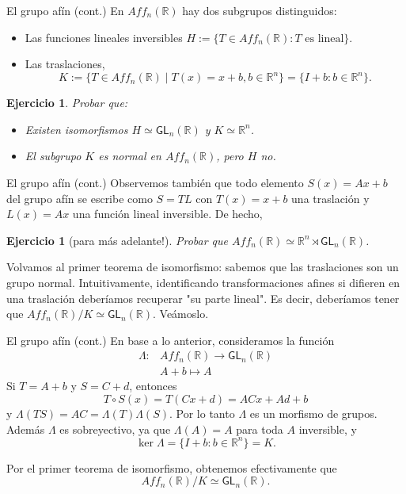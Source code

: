 \documentclass{beamer}
\def\R{\mathbb{R}}
\newtheorem{ejercicio}[teorema]{Ejercicio}
\begin{document}
\begin{frame}{El grupo afín (cont.)}
En $Aff_n(\R)$ hay dos subgrupos distinguidos:
\begin{itemize}
 \item Las funciones lineales inversibles $H := \{T \in Aff_n(\R) : \text{$T$ es lineal}\}$.
 \item Las traslaciones, 
\[
K := \{T \in Aff_n(\R) \mid T(x) = x+b, b \in \R^n\} = \{I + b : b \in \R^n\}.
\]
\end{itemize}

 \begin{ejercicio} Probar que:
\begin{itemize}
 \item Existen isomorfismos $H \simeq \mathsf{GL}_n(\R)$ y $K \simeq \R^n$.
 \item El subgrupo $K$ es normal en $Aff_n(\R)$, pero $H$ no. 
\end{itemize}
\end{ejercicio}
\end{frame}

\begin{frame}{El grupo afín (cont.)}
Observemos también que todo elemento $S(x) = Ax + b$ del grupo afín se escribe como $S = TL$ con $T(x) = x+b$ una traslación y $L(x) = Ax$ una función lineal inversible. De hecho,

\begin{ejercicio}[para más adelante!] Probar que $Aff_n(\R) \simeq \R^n \rtimes \mathsf{GL}_n(\R)$.
\end{ejercicio}
\medskip

Volvamos al primer teorema de isomorfismo: sabemos que las traslaciones son un grupo normal. Intuitivamente, identificando transformaciones afines si difieren en una traslación deberíamos recuperar "su parte lineal". Es decir, deberíamos tener que $Aff_n(\R)/K \simeq \mathsf{GL}_n(\R)$. Veámoslo.
\end{frame}

\begin{frame}{El grupo afín (cont.)}
En base a lo anterior, consideramos la función
\begin{align*}
\Lambda \colon &Aff_n(\R) \rightarrow \mathsf{GL}_n(\R) \\
&A+b \longmapsto A 
\end{align*}
 Si $T = A + b$ y $S = C + d$, entonces
\[
T \circ S(x) = T(Cx+d) = ACx + Ad + b
\]
y $\Lambda(TS) = AC = \Lambda(T)\Lambda(S)$. Por lo tanto $\Lambda$ es un morfismo de grupos. Además $\Lambda$ es sobreyectivo, ya que $\Lambda(A) = A$ para toda $A$ inversible, y
\[
\ker \Lambda = \{I+b : b \in \R^n\} = K.
\] 

Por el primer teorema de isomorfismo, obtenemos efectivamente que
\[
Aff_n(\R)/K \simeq \mathsf{GL}_n(\R).
\]
\end{frame}
\end{document}
